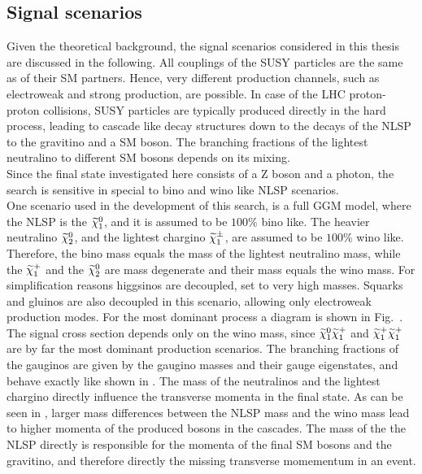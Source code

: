 \subsection{Signal scenarios}\label{sec:SMS}
Given the theoretical background, the signal scenarios considered in this thesis are discussed in the following. All couplings of the SUSY particles are the same as of their SM partners. Hence, very different production channels, such as electroweak and strong production, are possible. In case of the LHC proton-proton collisions, SUSY particles are typically produced directly in the hard process, leading to cascade like decay structures down to the decays of the NLSP to the gravitino and a SM boson. The branching fractions of the lightest neutralino to different SM bosons depends on its mixing. \\
Since the final state investigated here consists of a Z boson and a photon, the search is sensitive in special to bino and wino like NLSP scenarios.\\
One scenario used in the development of this search, is a full GGM model, where the NLSP is the $\widetilde{\chi}^{0}_{1}$, and it is assumed to be $100\%$ bino like. The heavier neutralino $\widetilde{\chi}^{0}_{2}$, and the lightest chargino $\widetilde{\chi}^\pm_{1}$, are assumed to be $100\%$ wino like. Therefore, the bino mass equals the mass of the lightest neutralino mass, while the $\widetilde{\chi}^{+}_{1}$ and the $\widetilde{\chi}^{0}_{2}$ are mass degenerate and their mass equals the wino mass. For simplification reasons higgsinos are decoupled, \ie set to very high masses. Squarks and gluinos are also decoupled in this scenario, allowing only electroweak production modes. For the most dominant process a diagram is shown in Fig.~. The signal cross section depends only on the wino mass, since $\widetilde{\chi}^{0}_{1}\widetilde{\chi}^{+}_{1}$ and $\widetilde{\chi}^{+}_{1}\widetilde{\chi}^{+}_{1}$ are by far the most dominant production scenarios. The branching fractions of the gauginos are given by the gaugino masses and their gauge eigenstates, and behave exactly like shown in . The mass of the neutralinos and the lightest chargino directly influence the transverse momenta in the final state. As can be seen in , larger mass differences between the NLSP mass and the wino mass lead to higher momenta of the produced bosons in the cascades. The mass of the the NLSP directly is responsible for the momenta of the final SM bosons and the gravitino, and therefore directly the missing transverse momementum in an event.\\

